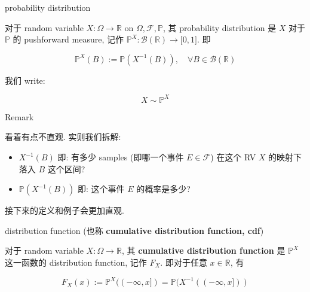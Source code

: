 \documentclass{qlnotes-export}
\begin{document}
\begin{definition}{probability distribution}\label{def-02-random-variables-probability-distribution}

对于 random variable \(X:\Omega\rightarrow{\mathbb{R}}\) on \(\Omega,\mathcal{F},{\mathbb{P}}\), 其 probability distribution 是 \(X\) 对于 \(\mathbb{P}\) 的 pushforward measure, 记作 \({\mathbb{P}}^{X}:\mathcal{B}({\mathbb{R}})\rightarrow\lbrack 0,1\rbrack\). 即

\[{\mathbb{P}}^{X}(B) := {\mathbb{P}}(X^{- 1}(B)),\quad\forall B \in \mathcal{B}({\mathbb{R}})\]

我们 write:

\[X \sim {\mathbb{P}}^{X}\]

\end{definition}

\begin{qlremark}{Remark}

看着有点不直观. 实则我们拆解:

\begin{itemize}
\item
  \(X^{- 1}(B)\) 即: 有多少 samples (即哪一个事件 \(E \in \mathcal{F}\)) 在这个 RV \(X\) 的映射下落入 \(B\) 这个区间?
\item
  \({\mathbb{P}}(X^{- 1}(B))\) 即: 这个事件 \(E\) 的概率是多少?
\end{itemize}

接下来的定义和例子会更加直观.

\end{qlremark}

\begin{definition}{distribution function (也称 \textbf{cumulative distribution function,
cdf})}\label{def-02-random-variables-distribution-function-cumulative-distribution-function-cdf}

对于 random variable \(X:\Omega\rightarrow{\mathbb{R}}\), 其 \textbf{cumulative distribution function} 是 \({\mathbb{P}}^{X}\) 这一函数的 distribution function, 记作 \(F_{X}\). 即对于任意 \(x \in {\mathbb{R}}\), 有

\[F_{X}(x) := {\mathbb{P}}^{X}(( - \infty,x\rbrack) = {\mathbb{P}}(X^{- 1}(( - \infty,x\rbrack))\]

\end{definition}
\end{document}
